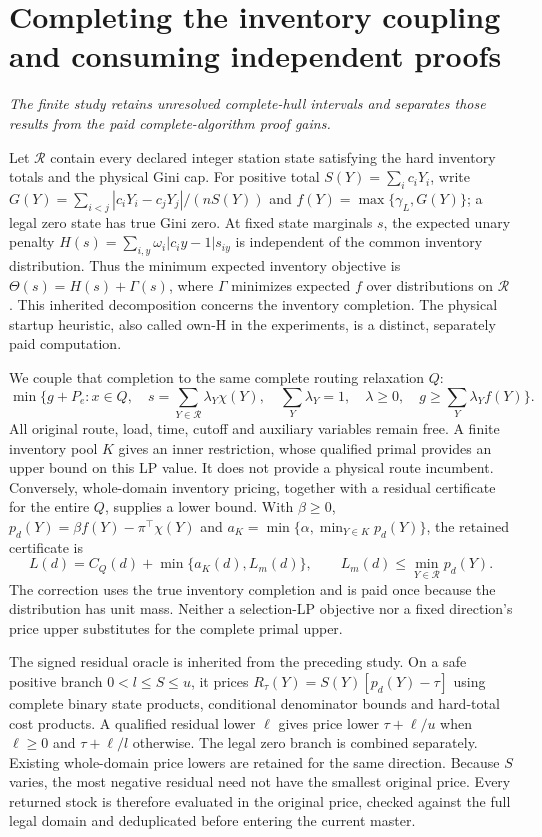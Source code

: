 \section{Completing the inventory coupling and consuming independent proofs}
\emph{The finite study retains unresolved complete-hull intervals and
separates those results from the paid complete-algorithm proof gains.}

Let $\mathcal R$ contain every declared integer station state satisfying
the hard inventory totals and the physical Gini cap. For positive total
$S(Y)=\sum_i c_iY_i$, write
$G(Y)=\sum_{i<j}|c_iY_i-c_jY_j|/(nS(Y))$ and
$f(Y)=\max\{\gamma_L,G(Y)\}$; a legal zero state has true Gini zero.
At fixed state marginals $s$, the expected unary penalty
$H(s)=\sum_{i,y}\omega_i|c_i y-1|s_{iy}$ is independent of the common
inventory distribution. Thus the minimum expected inventory objective is
$\Theta(s)=H(s)+\Gamma(s)$, where $\Gamma$ minimizes expected $f$ over
distributions on $\mathcal R$. This inherited decomposition concerns the
inventory completion. The physical startup heuristic, also called own-H
in the experiments, is a distinct, separately paid computation.

We couple that completion to the same complete routing relaxation $Q$:
\[
 \min\{g+P_e:x\in Q,\quad
 s=\sum_{Y\in\mathcal R}\lambda_Y\chi(Y),\quad
 \sum_Y\lambda_Y=1,\quad\lambda\ge0,\quad
 g\ge\sum_Y\lambda_Y f(Y)\}.
\]
All original route, load, time, cutoff and auxiliary variables remain free.
A finite inventory pool $K$ gives an inner restriction, whose qualified
primal provides an upper bound on this LP value. It does not provide a
physical route incumbent. Conversely, whole-domain inventory pricing,
together with a residual certificate for the entire $Q$, supplies a lower
bound. With $\beta\ge0$, $p_d(Y)=\beta f(Y)-\pi^\top\chi(Y)$ and
$a_K=\min\{\alpha,\min_{Y\in K}p_d(Y)\}$, the retained certificate is
\[
 L(d)=C_Q(d)+\min\{a_K(d),L_m(d)\},\qquad
 L_m(d)\le\min_{Y\in\mathcal R}p_d(Y).
\]
The correction uses the true inventory completion and is paid once because
the distribution has unit mass. Neither a selection-LP objective nor a
fixed direction's price upper substitutes for the complete primal upper.

The signed residual oracle is inherited from the preceding study. On a
safe positive branch $0<l\le S\le u$, it prices
$R_\tau(Y)=S(Y)[p_d(Y)-\tau]$ using complete binary state products,
conditional denominator bounds and hard-total cost products. A qualified
residual lower $\ell$ gives price lower $\tau+\ell/u$ when $\ell\ge0$
and $\tau+\ell/l$ otherwise. The legal zero branch is combined separately.
Existing whole-domain price lowers are retained for the same direction.
Because $S$ varies, the most negative residual need not have the smallest
original price. Every returned stock is therefore evaluated in the
original price, checked against the full legal domain and deduplicated
before entering the current master.

